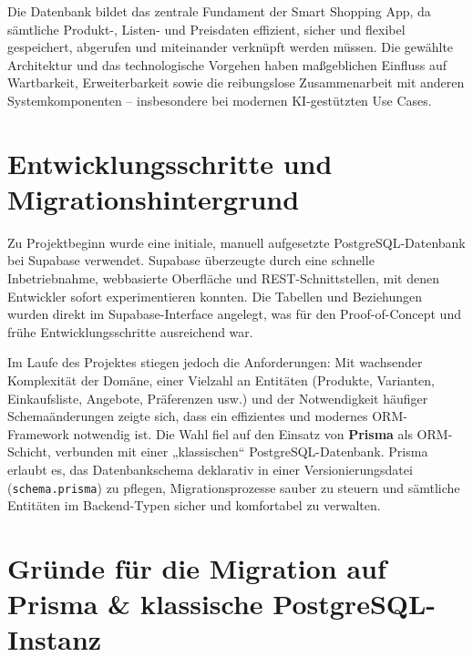 \documentclass[12pt, a4paper]{report} %
\begin{document}
Die Datenbank bildet das zentrale Fundament der Smart Shopping App, da sämtliche Produkt-, Listen- und Preisdaten effizient, sicher und flexibel gespeichert, abgerufen und miteinander verknüpft werden müssen. Die gewählte Architektur und das technologische Vorgehen haben maßgeblichen Einfluss auf Wartbarkeit, Erweiterbarkeit sowie die reibungslose Zusammenarbeit mit anderen Systemkomponenten – insbesondere bei modernen KI-gestützten Use Cases.

\section{Entwicklungsschritte und Migrationshintergrund}

Zu Projektbeginn wurde eine initiale, manuell aufgesetzte PostgreSQL-Datenbank bei Supabase verwendet. Supabase überzeugte durch eine schnelle Inbetriebnahme, webbasierte Oberfläche und REST-Schnittstellen, mit denen Entwickler sofort experimentieren konnten. Die Tabellen und Beziehungen wurden direkt im Supabase-Interface angelegt, was für den Proof-of-Concept und frühe Entwicklungsschritte ausreichend war.

Im Laufe des Projektes stiegen jedoch die Anforderungen: Mit wachsender Komplexität der Domäne, einer Vielzahl an Entitäten (Produkte, Varianten, Einkaufsliste, Angebote, Präferenzen usw.) und der Notwendigkeit häufiger Schemaänderungen zeigte sich, dass ein effizientes und modernes ORM-Framework notwendig ist. Die Wahl fiel auf den Einsatz von \textbf{Prisma} als ORM-Schicht, verbunden mit einer „klassischen“ PostgreSQL-Datenbank. Prisma erlaubt es, das Datenbankschema deklarativ in einer Versionierungsdatei (\texttt{schema.prisma}) zu pflegen, Migrationsprozesse sauber zu steuern und sämtliche Entitäten im Backend-Typen sicher und komfortabel zu verwalten.

\section{Gründe für die Migration auf Prisma \& klassische PostgreSQL-Instanz}
\end{document}

